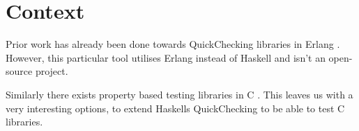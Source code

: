 \section{Context}


Prior work has already been done towards QuickChecking libraries in Erlang \citep{QuickCheckAUTOSAR}.
However, this particular tool utilises Erlang instead of Haskell and isn't an open-source project.

Similarly there exists property based testing libraries in C \citep{theft}.
This leaves us with a very interesting options, to extend Haskells QuickChecking to be able to test C libraries.
